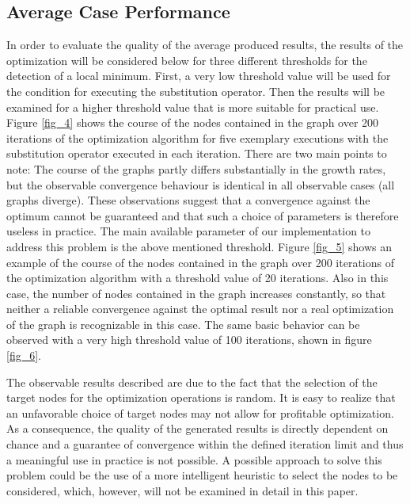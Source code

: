 \documentclass[
	accentcolor=1c,%
	type=intern,
	marginpar=false,
	ruledheaders=section,
	class=report,
	BCOR=5mm,
      parskip=half-,
	fontsize=10pt
	]{tudapub}
\begin{document}
		\subsection{Average Case Performance}
			In order to evaluate the quality of the average produced results, the results of the optimization will be considered below for three different thresholds for the detection of a local minimum.
			First, a very low threshold value will be used for the condition for executing the substitution operator.
			Then the results will be examined for a higher threshold value that is more suitable for practical use.
			Figure \ref{fig_4} shows the course of the nodes contained in the graph over 200 iterations of the optimization algorithm for five exemplary executions with the substitution operator executed in each iteration.
			There are two main points to note: The course of the graphs partly differs substantially in the growth rates, but the observable convergence behaviour is identical in all observable cases (all graphs diverge).
			These observations suggest that a convergence against the optimum cannot be guaranteed and that such a choice of parameters is therefore useless in practice.
			The main available parameter of our implementation to address this problem is the above mentioned threshold.
			Figure \ref{fig_5} shows an example of the course of the nodes contained in the graph over 200 iterations of the optimization algorithm with a threshold value of 20 iterations.
			Also in this case, the number of nodes contained in the graph increases constantly, so that neither a reliable convergence against the optimal result nor a real optimization of the graph is recognizable in this case.
			The same basic behavior can be observed with a very high threshold value of 100 iterations, shown in figure \ref{fig_6}.

			The observable results described are due to the fact that the selection of the target nodes for the optimization operations is random.
			It is easy to realize that an unfavorable choice of target nodes may not allow for profitable optimization.
			As a consequence, the quality of the generated results is directly dependent on chance and a guarantee of convergence within the defined iteration limit and thus a meaningful use in practice is not possible.
			A possible approach to solve this problem could be the use of a more intelligent heuristic to select the nodes to be considered, which, however, will not be examined in detail in this paper.
\end{document}
